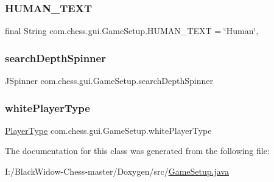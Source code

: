 \subsubsection{\texorpdfstring{HUMAN\_TEXT}{HUMAN\_TEXT}}
{\footnotesize\ttfamily final String com.\+chess.\+gui.\+Game\+Setup.\+H\+U\+M\+A\+N\+\_\+\+T\+E\+XT = \char`\"{}Human\char`\"{}\hspace{0.3cm}{\ttfamily [static]}, {\ttfamily [private]}}

\mbox{\label{classcom_1_1chess_1_1gui_1_1_game_setup_a11793a6ff225429e99f87fd9fc507e0c}} 
\subsubsection{\texorpdfstring{searchDepthSpinner}{searchDepthSpinner}}
{\footnotesize\ttfamily J\+Spinner com.\+chess.\+gui.\+Game\+Setup.\+search\+Depth\+Spinner\hspace{0.3cm}{\ttfamily [private]}}

\mbox{\label{classcom_1_1chess_1_1gui_1_1_game_setup_af788c7bfbd55522bb4e98609ede0e695}} 
\subsubsection{\texorpdfstring{whitePlayerType}{whitePlayerType}}
{\footnotesize\ttfamily \mbox{\hyperlink{enumcom_1_1chess_1_1gui_1_1_table_1_1_player_type}{Player\+Type}} com.\+chess.\+gui.\+Game\+Setup.\+white\+Player\+Type\hspace{0.3cm}{\ttfamily [private]}}



The documentation for this class was generated from the following file\+:\begin{DoxyCompactItemize}
\item 
I\+:/\+Black\+Widow-\/\+Chess-\/master/\+Doxygen/src/\mbox{\hyperlink{_game_setup_8java}{Game\+Setup.\+java}}\end{DoxyCompactItemize}
